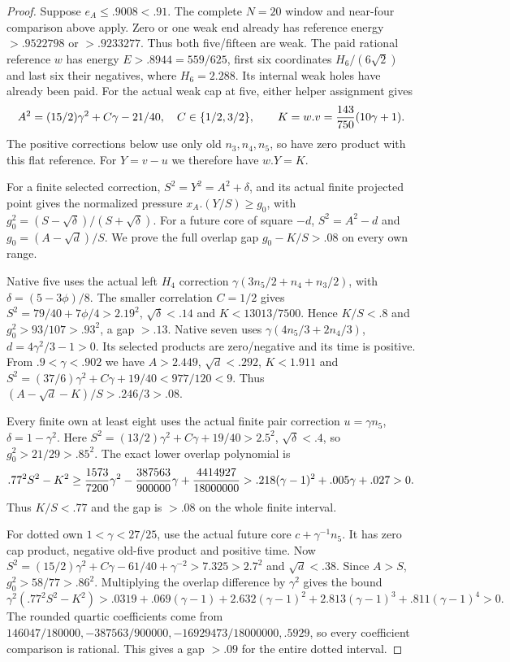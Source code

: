 \documentclass[11pt]{article}
\theoremstyle{definition}
\theoremstyle{remark}
\begin{document}
\begin{proof}
Suppose $e_A\le.9008<.91$. The complete $N=20$ window and near-four
comparison above apply. Zero or one weak end already has reference
energy $>.9522798$ or $>.9233277$. Thus both five/fifteen are weak.
The paid rational reference $w$ has energy $E>.8944=559/625$,
first six coordinates $H_6/(6\sqrt2)$ and last six their negatives,
where $H_6=2.288$. Its internal weak holes have already been paid.
For the actual weak cap at five, either helper assignment gives
\[
 A^2=(15/2)\gamma^2+C\gamma-21/40,\quad C\in\{1/2,3/2\},
 \qquad K=w.v={143\over750}(10\gamma+1).
\]
The positive corrections below use only old $n_3,n_4,n_5$, so have
zero product with this flat reference. For $Y=v-u$ we therefore
have $w.Y=K$.

For a finite selected correction, $S^2=Y^2=A^2+\delta$,
and its actual finite projected point gives the normalized pressure
$x_A.(Y/S)\ge g_0$, with
$g_0^2=(S-\sqrt\delta)/(S+\sqrt\delta)$.
For a future core of square $-d$, $S^2=A^2-d$ and
$g_0=(A-\sqrt d)/S$.
We prove the full overlap gap $g_0-K/S>.08$ on every own range.

Native five uses the actual left $H_4$ correction
$\gamma(3n_5/2+n_4+n_3/2)$, with
$\delta=(5-3\phi)/8$. The smaller correlation $C=1/2$ gives
$S^2=79/40+7\phi/4>2.19^2$, $\sqrt\delta<.14$ and
$K<13013/7500$. Hence $K/S<.8$ and
$g_0^2>93/107>.93^2$, a gap $>.13$.
Native seven uses $\gamma(4n_5/3+2n_4/3)$,
$d=4\gamma^2/3-1>0$. Its selected products are zero/negative
and its time is positive. From $.9<\gamma<.902$ we have
$A>2.449$, $\sqrt d<.292$, $K<1.911$ and
$S^2=(37/6)\gamma^2+C\gamma+19/40<977/120<9$.
Thus $(A-\sqrt d-K)/S>.246/3>.08$.

Every finite own at least eight uses the actual finite pair correction
$u=\gamma n_5$, $\delta=1-\gamma^2$.
Here $S^2=(13/2)\gamma^2+C\gamma+19/40>2.5^2$,
$\sqrt\delta<.4$, so $g_0^2>21/29>.85^2$.
The exact lower overlap polynomial is
\[
 .77^2S^2-K^2\ge
 {1573\over7200}\gamma^2-{387563\over900000}\gamma
                +{4414927\over18000000}
 >.218(\gamma-1)^2+.005\gamma+.027>0.
\]
Thus $K/S<.77$ and the gap is $>.08$ on the whole finite interval.

For dotted own $1<\gamma<27/25$, use the actual future core
$c+\gamma^{-1}n_5$. It has zero cap product, negative old-five
product and positive time. Now
$S^2=(15/2)\gamma^2+C\gamma-61/40+\gamma^{-2}>7.325>2.7^2$
and $\sqrt d<.38$. Since $A>S$, $g_0^2>58/77>.86^2$.
Multiplying the overlap difference by $\gamma^2$ gives the bound
\[
 \gamma^2(.77^2S^2-K^2)>
 .0319+.069(\gamma-1)+2.632(\gamma-1)^2
       +2.813(\gamma-1)^3+.811(\gamma-1)^4>0.
\]
The rounded quartic coefficients come from
$146047/180000,-387563/900000,-16929473/18000000,.5929$,
so every coefficient comparison is rational. This gives a gap
$>.09$ for the entire dotted interval.


\end{proof}
\end{document}
